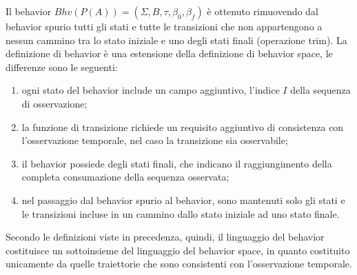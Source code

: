Il behavior $Bhv(P(A)) = (\Sigma,B,\tau,\beta_0,\beta_f)$ è ottenuto rimuovendo dal behavior spurio tutti gli stati e tutte le transizioni che non appartengono a nessun cammino tra lo stato iniziale e uno degli stati finali (operazione trim).
La definizione di behavior è una estensione della definizione di behavior space, le differenze sono le seguenti:
\begin{enumerate}
\item ogni stato del behavior include un campo aggiuntivo, l'indice $I$ della sequenza di osservazione;
\item la funzione di transizione richiede un requisito aggiuntivo di consistenza con l'osservazione temporale, nel caso la transizione sia osservabile;
\item il behavior possiede degli stati finali, che indicano il raggiungimento della completa consumazione della sequenza osservata;
\item nel passaggio dal behavior spurio al behavior, sono mantenuti solo gli stati e le transizioni incluse in un cammino dallo stato iniziale ad uno stato finale.
\end{enumerate}
Secondo le definizioni viste in precedenza, quindi, il linguaggio del behavior costituisce un sottoinsieme del linguaggio del behavior space, in quanto costituito unicamente da quelle traiettorie che sono consistenti con l'osservazione temporale.